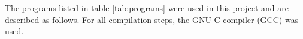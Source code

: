 \label{sec:programs}
The programs listed in table \ref{tab:programs} were used in this project and
are described as follows. For all compilation steps, the GNU C compiler (GCC)
was used.



